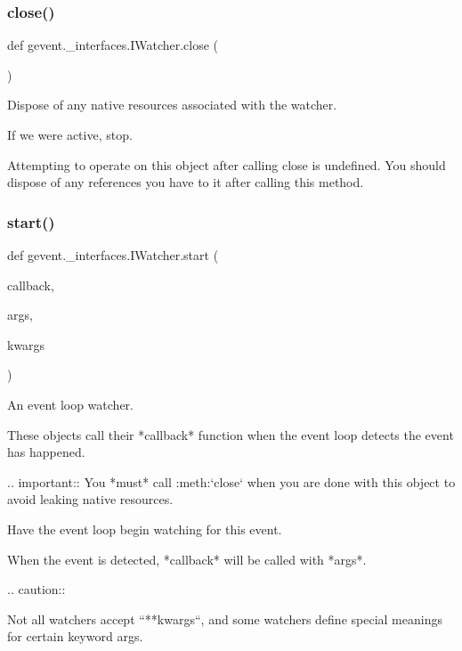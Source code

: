 \subsubsection{\texorpdfstring{close()}{close()}}
{\footnotesize\ttfamily def gevent.\+\_\+interfaces.\+I\+Watcher.\+close (\begin{DoxyParamCaption}{ }\end{DoxyParamCaption})}

\begin{DoxyVerb}Dispose of any native resources associated with the watcher.

If we were active, stop.

Attempting to operate on this object after calling close is
undefined. You should dispose of any references you have to it
after calling this method.
\end{DoxyVerb}
 \mbox{\label{classgevent_1_1__interfaces_1_1_i_watcher_a0ecb4c9a628a14ba3cd45bdf0b2a7387}} 
\subsubsection{\texorpdfstring{start()}{start()}}
{\footnotesize\ttfamily def gevent.\+\_\+interfaces.\+I\+Watcher.\+start (\begin{DoxyParamCaption}\item[{}]{callback,  }\item[{}]{args,  }\item[{}]{kwargs }\end{DoxyParamCaption})}

\begin{DoxyVerb}An event loop watcher.

These objects call their *callback* function when the event
loop detects the event has happened.

.. important:: You *must* call :meth:`close` when you are
   done with this object to avoid leaking native resources.
\end{DoxyVerb}
\begin{DoxyVerb}Have the event loop begin watching for this event.

When the event is detected, *callback* will be called with
*args*.

.. caution::

    Not all watchers accept ``**kwargs``,
    and some watchers define special meanings for certain keyword args.
\end{DoxyVerb}
 \mbox{\label{classgevent_1_1__interfaces_1_1_i_watcher_a285925e2c547d325758920cf94f961b6}} 
